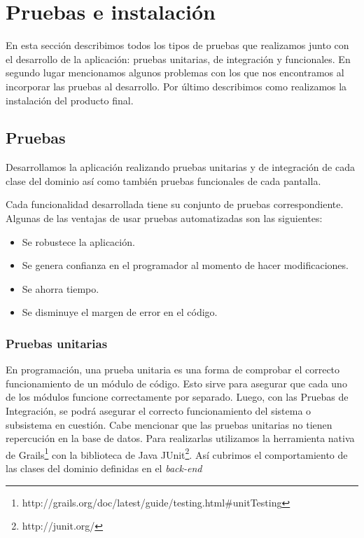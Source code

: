 \section{Pruebas e instalación}
En esta sección describimos todos los tipos de pruebas que realizamos junto con el desarrollo de la aplicación: pruebas unitarias, de integración y funcionales. En segundo lugar mencionamos algunos problemas con los que nos encontramos al incorporar las pruebas al desarrollo. Por último describimos como realizamos la instalación del producto final.

\subsection{Pruebas}
Desarrollamos la aplicación realizando pruebas unitarias y de integración de cada clase del dominio así como también pruebas funcionales de cada pantalla.

Cada funcionalidad desarrollada tiene su conjunto de pruebas correspondiente. Algunas de las ventajas de usar pruebas automatizadas son las siguientes:

\begin{itemize}
\item Se robustece la aplicación.
\item Se genera confianza en el programador al momento de hacer modificaciones.
\item Se ahorra tiempo.
\item Se disminuye el margen de error en el código.
\end{itemize}

\subsubsection{Pruebas unitarias}
En programación, una prueba unitaria es una forma de comprobar el correcto funcionamiento de un módulo de código. Esto sirve para asegurar que cada uno de los módulos funcione correctamente por separado. Luego, con las Pruebas de Integración, se podrá asegurar el correcto funcionamiento del sistema o subsistema en cuestión. Cabe mencionar que las pruebas unitarias no tienen repercución en la base de datos. Para realizarlas utilizamos la herramienta nativa de Grails\footnote{http://grails.org/doc/latest/guide/testing.html\#unitTesting} con la biblioteca de Java JUnit\footnote{http://junit.org/}. Así cubrimos el comportamiento de las clases del dominio definidas en el \textit{back-end}

